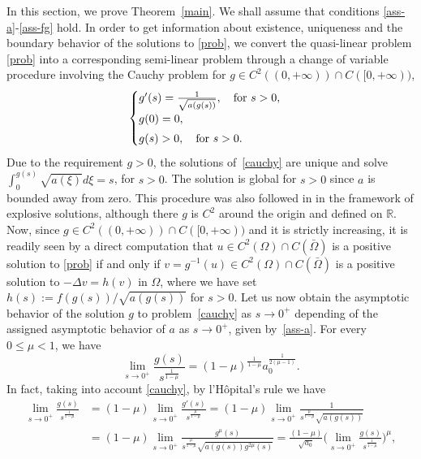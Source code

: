 \documentclass[10pt]{amsart}
\numberwithin{equation}{section}
\theoremstyle{definition}
\newcommand{\R}{{\mathbb R}}
\begin{document}
In this section, we prove Theorem~\ref{main}. We shall assume that conditions \eqref{ass-a}-\eqref{ass-fg} hold.
In order to get information about existence, uniqueness and the boundary behavior of the solutions to \eqref{prob}, 
we convert the quasi-linear problem \eqref{prob} into a corresponding semi-linear
problem through a change of variable procedure involving the Cauchy problem for $g\in C^2((0,+\infty))\cap C([0,+\infty))$,
\begin{equation}
	\label{cauchy}
	\begin{cases}
g'(s)=\frac{1}{\sqrt{a(g(s))}},\quad \text{for $s>0$}, &\\
g(0)=0, & \\
\noalign{\vskip3pt}
g(s)>0, \quad\text{for $s>0$}. &
\end{cases}
\end{equation}
Due to the requirement $g>0$, the solutions of~\eqref{cauchy} are unique and solve $\int_0^{g(s)}\sqrt{a(\xi)}d\xi=s$, for $s>0$.
The solution is global for $s>0$ since $a$ is bounded away from zero.
This procedure was also followed in  \cite{GlasquII} in the framework of explosive solutions, although
there $g$ is $C^2$ around the origin and defined on $\R$. Now, since $g\in C^2((0,+\infty))\cap C([0,+\infty))$
and it is strictly increasing, it is readily seen by a direct computation that 
$u\in C^2(\Omega)\cap C(\bar\Omega)$ is a positive solution to \eqref{prob} if and only if 
$v=g^{-1}(u)\in C^2(\Omega)\cap C(\bar\Omega)$ is a positive solution to 
$-\Delta v=h(v)$ in $\Omega$, where we have set $h(s):=f(g(s))/\sqrt{a(g(s))}$ for $s>0$.
Let us now obtain the asymptotic behavior of the solution $g$ to problem~\eqref{cauchy} as $s\to 0^+$ depending 
of the assigned asymptotic behavior of $a$ as $s\to 0^+$, given by~\eqref{ass-a}. For every $0\leq \mu<1$, we have 
\begin{equation}
	\label{gatzero}
\lim_{s\to 0^+}\frac{g(s)}{s^{\frac{1}{1-\mu}}}=(1-\mu)^{\frac{1}{1-\mu}} a_0^{\frac{1}{2(\mu-1)}}.      
\end{equation}
In fact, taking into account \eqref{cauchy}, by l'H\^ opital's rule we have
\begin{align*}
\lim_{s\to 0^+}\frac{g(s)}{s^{\frac{1}{1-\mu}}}&=(1-\mu)\lim_{s\to 0^+}\frac{g'(s)}{s^{\frac{\mu}{1-\mu}}}
=(1-\mu)\lim_{s\to 0^+}\frac{1}{s^{\frac{\mu}{1-\mu}}\sqrt{a(g(s))}} \\
& =(1-\mu)\lim_{s\to 0^+}\frac{g^\mu(s)}{s^{\frac{\mu}{1-\mu}}\sqrt{a(g(s))g^{2\mu}(s)}} =
\frac{(1-\mu)}{\sqrt{a_0}} \Big(\lim_{s\to 0^+}  \frac{g(s)}{s^{\frac{1}{1-\mu}}}\Big)^\mu,
\end{align*}
\end{document}

